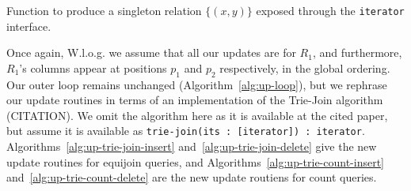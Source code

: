 \begin{algorithm}

  \caption{Function to produce a singleton relation $\{(x, y)\}$ exposed through the \texttt{iterator} interface.}\label{alg:singleton-it}
\end{algorithm}

Once again, W.l.o.g. we assume that all our updates are for $R_1$, and furthermore, $R_1$'s columns appear at positions $p_1$ and $p_2$ respectively, in the global ordering. Our outer loop remains unchanged (Algorithm~\ref{alg:up-loop}), but we rephrase our update routines in terms of an implementation of the Trie-Join algorithm (CITATION). We omit the algorithm here as it is available at the cited paper, but assume it is available as \texttt{trie-join(its\,:\,[iterator])\,:\,iterator}. Algorithms~\ref{alg:up-trie-join-insert} and~\ref{alg:up-trie-join-delete} give the new update routines for equijoin queries, and Algorithms~\ref{alg:up-trie-count-insert} and~\ref{alg:up-trie-count-delete} are the new update routiens for count queries.\\[1em]

